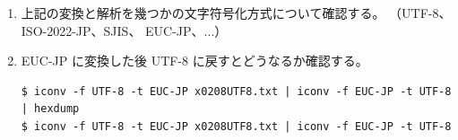 \documentclass[a4j,dvipdfmx]{jarticle}
\begin{document}
\begin{enumerate}
\begin{enumerate}
\item 上記の変換と解析を幾つかの文字符号化方式について確認する。
（UTF-8、ISO-2022-JP、SJIS、 EUC-JP、...）

\item EUC-JP に変換した後 UTF-8 に戻すとどうなるか確認する。

\begin{lstlisting}[numbers=none]
$ iconv -f UTF-8 -t EUC-JP x0208UTF8.txt | iconv -f EUC-JP -t UTF-8 | hexdump
$ iconv -f UTF-8 -t EUC-JP x0208UTF8.txt | iconv -f EUC-JP -t UTF-8
\end{lstlisting}

\end{enumerate}

%

\end{enumerate}
\end{document}
